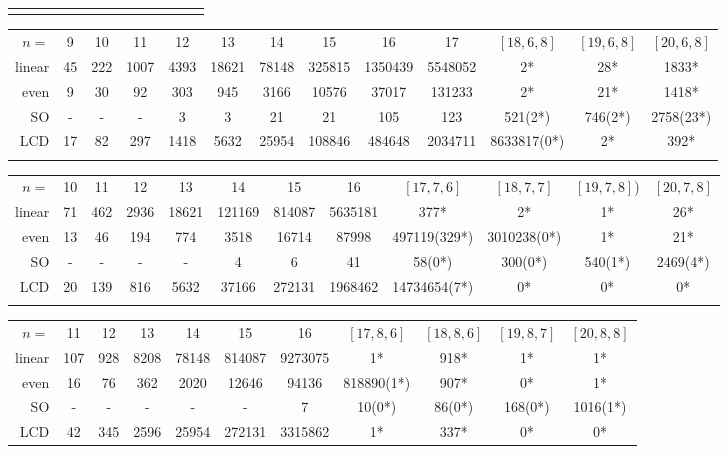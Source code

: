 \documentclass[a4paper,11pt]{article}
\begin{document}
\begin{table}
{\begin{tabular}{r|c|c|c|c|c|c|c|c|c|c|c|c|c}
\noalign{\smallskip}\hline
\end{tabular}
\begin{tabular}{r|c|c|c|c|c|c|c|c|c|c|c|c}
\hline\noalign{\smallskip}
\multicolumn{13}{c}{$k=6$} \\
\hline
$n=$    &  9 & 10& 11 &  12& 13& 14& 15& 16& 17& $[18,6,8]$& $[19,6,8]$& $[20,6,8]$\\
\hline
linear  & 	45&	222&	1007&	4393&	18621&	78148&	325815&	1350439&	5548052&2*	& 28* &1833*\\
even    &  	9&	30&	92&	303&	945&	3166&	10576&	37017&	131233&	2*&	21*&	1418*\\
SO      &  	-&	-&	-&	3&	3&	21&	21&	105&	123&	521(2*)&	746(2*)&	2758(23*)\\
LCD     &  	17&	82&	297&	1418&	5632&	25954&	108846&	484648&	2034711&	8633817(0*)	&	2* &392*\\
\noalign{\smallskip}\hline
\end{tabular}
\begin{tabular}{r|c|c|c|c|c|c|c|c|c|c|c}
\hline\noalign{\smallskip}
\multicolumn{12}{c}{$k=7$} \\
\hline
$n=$    &  10& 11 &  12& 13& 14& 15& 16& $[17,7,6]$& $[18,7,7]$& $[19,7,8]$)& $[20,7,8]$\\
\hline
linear  &		71&	462&	2936&	18621&	121169&	814087&	5635181&	377*&	2*&1*	&	26*\\
even    &		13&	46&	194&	774&	3518&	16714&	87998&	497119(329*)&	3010238(0*)&	1*&	21*\\
SO      &		-&	-&	-&	-&	4&	6&	41&	58(0*)&	300(0*)&	540(1*)&	2469(4*)\\
LCD     &		20&	139&	816&	5632&	37166&	272131&	1968462&	14734654(7*)&	0*&	0*&	0*\\
\noalign{\smallskip}\hline
\end{tabular}
\begin{tabular}{r|c|c|c|c|c|c|c|c|c|c}
\hline\noalign{\smallskip}
\multicolumn{11}{c}{$k=8$} \\
\hline
$n=$    &  11 &  12& 13& 14& 15& 16& $[17,8,6]$& $[18,8,6]$& $[19,8,7]$& $[20,8,8]$\\
\hline
linear  &		107&	928&	8208&	78148&	814087&	9273075&	1*&	918*&	1*&	1*\\
even    &		16&	76&	362&	2020&	12646&	94136&	818890(1*)&	907*&	0*&	1*\\
SO      &		-&	-&	-&	-&	-&	7&	10(0*)&	86(0*)&	168(0*)&	1016(1*)\\
LCD     &		42&	345&	2596&	25954&	272131&	3315862&  1*&	337*&	0*&	0*\\

\end{tabular}}
\end{table}
\end{document}
